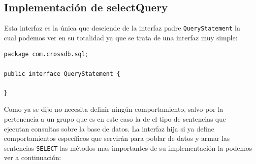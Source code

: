 \subsection{Implementación de selectQuery}

Esta interfaz es la única que desciende de la interfaz padre \verb=QueryStatement= la cual podemos ver en su totalidad ya que se trata de una interfaz muy simple:

\begin{lstlisting}[title=código interfaz QueryStatement]
package com.crossdb.sql;

public interface QueryStatement {

}
\end{lstlisting}

Como ya se dijo no necesita definir ningún comportamiento, salvo por la pertenencia a un grupo que es en este caso la de el tipo de sentencias que ejecutan consultas sobre la base de datos. La interfaz hija si ya define comportamientos específicos que servirán para poblar de datos y armar las sentencias \verb=SELECT= las métodos mas importantes de su implementación la podemos ver a continuación:


